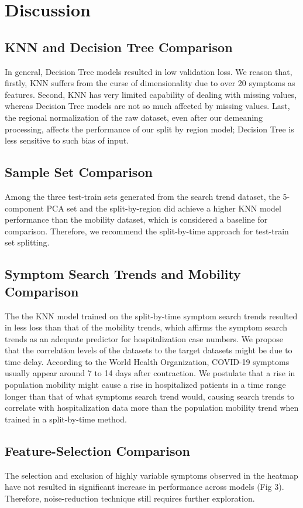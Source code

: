\documentclass[12pt]{article}
\begin{document}
\section{Discussion}

\subsection{KNN and Decision Tree Comparison}
In general, Decision Tree models resulted in low validation loss. We reason that, firstly, KNN suffers from the curse of dimensionality due to over 20 symptoms as features. Second, KNN has very limited capability of dealing with missing values, whereas Decision Tree models are not so much affected by missing values. Last, the regional normalization of the raw dataset, even after our demeaning processing, affects the performance of our split by region model; Decision Tree is less sensitive to such bias of input.

\subsection{Sample Set Comparison}
Among the three test-train sets generated from the search trend dataset, the 5-component PCA set and the split-by-region did achieve a higher KNN model performance than the mobility dataset, which is considered a baseline for comparison. Therefore, we recommend the split-by-time approach for test-train set splitting. 

\subsection{Symptom Search Trends and Mobility Comparison}
The the KNN model trained on the split-by-time symptom search trends resulted in less loss than that of the mobility trends, which affirms the symptom search trends as an adequate predictor for hospitalization case numbers. We propose that the correlation levels of the datasets to the target datasets might be due to time delay. According to the World Health Organization, COVID-19 symptoms usually appear around 7 to 14 days after contraction. We postulate that a rise in population mobility might cause a rise in hospitalized patients in a time range longer than that of what symptoms search trend would, causing search trends to correlate with hospitalization data more than the population mobility trend when trained in a split-by-time method.

\subsection{Feature-Selection Comparison}
The selection and exclusion of highly variable symptoms observed in the heatmap have not resulted in significant increase in performance across models (Fig 3). Therefore, noise-reduction technique still requires further exploration.
\end{document}
